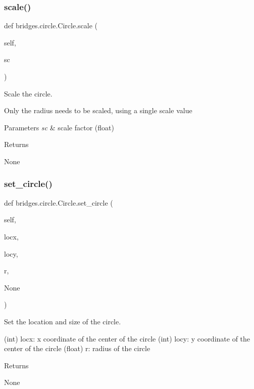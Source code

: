 \subsubsection{\texorpdfstring{scale()}{scale()}}
{\footnotesize\ttfamily def bridges.\+circle.\+Circle.\+scale (\begin{DoxyParamCaption}\item[{}]{self,  }\item[{}]{sc }\end{DoxyParamCaption})}



Scale the circle. 

Only the radius needs to be scaled, using a single scale value


\begin{DoxyParams}{Parameters}
{\em sc} & scale factor (float) \\
\hline
\end{DoxyParams}
\begin{DoxyReturn}{Returns}


None 
\end{DoxyReturn}
\mbox{\label{classbridges_1_1circle_1_1_circle_a42b7ccd17017ca328371ce27e1bdbffe}} 
\subsubsection{\texorpdfstring{set\+\_\+circle()}{set\_circle()}}
{\footnotesize\ttfamily def bridges.\+circle.\+Circle.\+set\+\_\+circle (\begin{DoxyParamCaption}\item[{}]{self,  }\item[{}]{locx,  }\item[{}]{locy,  }\item[{}]{r,  }\item[{}]{None }\end{DoxyParamCaption})}



Set the location and size of the circle. 

(int) locx\+: x coordinate of the center of the circle (int) locy\+: y coordinate of the center of the circle (float) r\+: radius of the circle \begin{DoxyReturn}{Returns}


None
\end{DoxyReturn}

